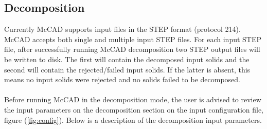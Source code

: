 \documentclass[12pt, a4paper, titlepage]{article}
\begin{document}
  \subsection{Decomposition}
    Currently McCAD supports input files in the STEP format (protocol 214). McCAD accepts both single and multiple input STEP files. For each input STEP file, after successfully running McCAD decomposition two STEP output files will be written to disk. The first will contain the decomposed input solids and the second will contain the rejected/failed input solids. If the latter is absent, this means no input solids were rejected and no solids failed to be decomposed. \\
    \\
    Before running McCAD in the decomposition mode, the user is advised to review the input parameters on the decomposition section on the input configuration file, figure (\ref{fig:config}). Below is a description of the decomposition input parameters.
\end{document}
